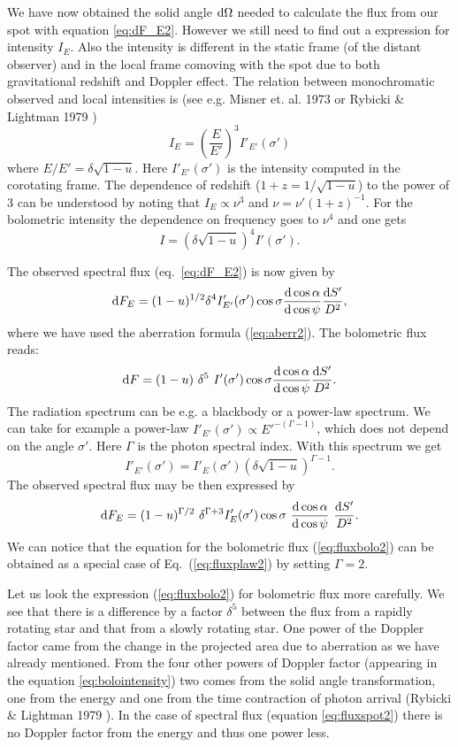 \documentclass{wihuri}
\def\be{\begin{equation}}
\def\ee{\end{equation}}
\def\d{{\rm d}}
\def\Dop{\delta}
\begin{document}

We have now obtained the solid angle $\d\Omega$ needed to calculate the flux from our spot with equation \ref{eq:dF_E2}. However we still need to find out a expression for intensity $I_{E}$. Also the intensity is different in the static frame (of the distant observer) and in the local frame comoving with the spot due to both gravitational redshift and Doppler effect. The relation between monochromatic observed and local intensities is (see e.g. Misner et. al. 1973 \cite{mtw} or Rybicki \& Lightman 1979 \cite{rybicki})%
\be
I_{E} = \left (\frac{E}{E'}\right )^3 I'_{E '} (\sigma')
\ee
where $E/E'=\Dop \sqrt{1-u}$. Here $I'_{E'}(\sigma')$ is the intensity computed in the corotating frame. The dependence of redshift ($1+z = 1/\sqrt{1-u}$) to the power of 3 can be understood by noting that $I_{E} \propto \nu^{3}$ and $\nu = \nu'(1+z)^{-1}$.
For the bolometric intensity the dependence on frequency goes to $\nu^{4}$ and one gets
\be \label{eq:bolointensity}
I= \left (\Dop \sqrt{1-u} \right )^4 I'(\sigma') .
\ee

The observed spectral flux (eq.~\ref{eq:dF_E2}) is now given by
\be \label{eq:fluxspot2}
\d F_{E}=(1-u)^{1/2} \Dop^{4} I'_{E'}(\sigma') \cos\sigma
\frac{\d \cos\alpha}{\d\cos\psi}
 \frac{\d S'}{D^2} ,
\ee
where we have used the aberration formula (\ref{eq:aberr2}).
The bolometric flux reads:
\be  \label{eq:fluxbolo2}
\d F= (1-u)\ \Dop^5 \
I'(\sigma')  \cos\sigma \frac{\d\cos\alpha}{\d\cos\psi} \frac{\d S'}{D^2} .
\ee
The radiation spectrum can be e.g. a blackbody or a power-law spectrum. We can take for example a power-law $I'_{E'}(\sigma') \propto E '^{-(\Gamma-1)}$, which does not depend on the angle $\sigma'$. Here $\Gamma$ is the photon spectral index. With this spectrum we get
\be \label{eq:int_trans2}
I'_{E'}(\sigma') = I'_{E}(\sigma')
\left( \Dop \sqrt{1-u} \right)^{\Gamma-1} .
\ee
The observed spectral flux %
may be then expressed by 
\be\label{eq:fluxplaw2}
\d F_{E}= (1-u)^{\Gamma/2}\ \Dop^{\Gamma+3} I'_E(\sigma')
\cos\sigma\ \frac{\d\cos\alpha}{\d\cos\psi}\ \frac{\d S'}{D^2}.
\ee
We can notice that the equation for the bolometric flux (\ref{eq:fluxbolo2})
can be obtained as a special case of Eq.~(\ref{eq:fluxplaw2}) by setting $\Gamma=2$. 

Let us look the expression (\ref{eq:fluxbolo2}) for bolometric flux more carefully. We see that there is a difference by a factor $\Dop^5$ between the flux from a rapidly rotating star and that from a slowly rotating star. One power of the Doppler factor came from the change in the projected area due to aberration as we have already mentioned. From the four other powers of Doppler factor (appearing in the equation \ref{eq:bolointensity}) two comes from the solid angle transformation, one from the energy and one from the time contraction of photon arrival (Rybicki \& Lightman 1979 \cite{rybicki}). In the case of spectral flux (equation \ref{eq:fluxspot2}) there is no Doppler factor from the energy and thus one power less.
\end{document}
